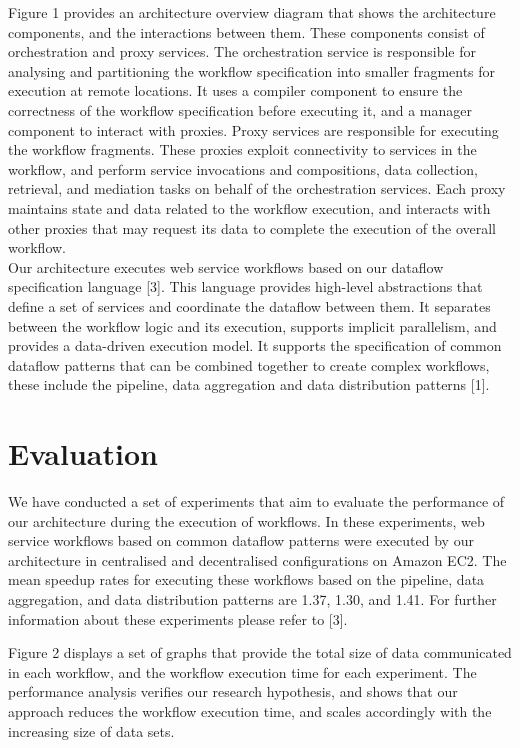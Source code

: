 \documentclass[10pt, conference, compsocconf]{IEEEtran}
\begin{document}
Figure 1 provides an architecture overview diagram that shows the architecture components, and the interactions between them. These components consist of orchestration and proxy services. The orchestration service is responsible for analysing and partitioning the workflow specification into smaller fragments for execution at remote locations. It uses a compiler component to ensure the correctness of the workflow specification before executing it, and a manager component to interact with proxies. Proxy services are responsible for executing the workflow fragments. These proxies exploit connectivity to services in the workflow, and perform service invocations and compositions, data collection, retrieval, and mediation tasks on behalf of the orchestration services. Each proxy maintains state and data related to the workflow execution, and interacts with other proxies that may request its data to complete the execution of the overall workflow.\\

Our architecture executes web service workflows based on our dataflow specification language [3]. This language provides high-level abstractions that define a set of services and coordinate the dataflow between them. It separates between the workflow logic and its execution, supports implicit parallelism, and provides a data-driven execution model. It supports the specification of common dataflow patterns that can be combined together to create complex workflows, these include the pipeline, data aggregation and data distribution patterns [1].

\section{Evaluation}

We have conducted a set of experiments that aim to evaluate the performance of our architecture during the execution of workflows. In these experiments, web service workflows based on common dataflow patterns were executed by our architecture in centralised and decentralised configurations on Amazon EC2. The mean speedup rates for executing these workflows based on the pipeline, data aggregation, and data distribution patterns are 1.37, 1.30, and 1.41. For further information about these experiments please refer to [3].

Figure 2 displays a set of graphs that provide the total size of data communicated in each workflow, and the workflow execution time for each experiment. The performance analysis verifies our research hypothesis, and shows that our approach reduces the workflow execution time, and scales accordingly with the increasing size of data sets.
\end{document}
